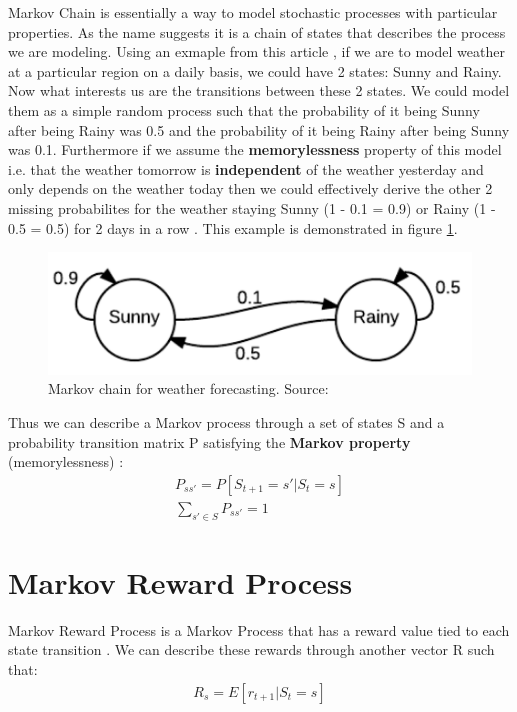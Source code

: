 Markov Chain is essentially a way to model stochastic
processes with
particular properties. As the name suggests it is a chain of
states that describes the process we are modeling. Using an
exmaple from this article \cite{markov_chain_article}, if we
are to model weather at a particular region on a daily basis,
we could have 2 states: Sunny and Rainy. Now what interests us
are the transitions between these 2 states. We could model
them as a simple random process such that the probability of
it being Sunny after being Rainy was 0.5 and the probability
of it being Rainy after being Sunny was 0.1. Furthermore if we
assume the \textbf{memorylessness} property of this model i.e.
that the weather tomorrow is \textbf{independent} of the
weather yesterday and only depends on the weather today then
we could effectively derive the other 2 missing probabilites
for the weather staying Sunny (1 - 0.1 = 0.9) or Rainy (1 -
0.5 = 0.5) for 2 days in a row \cite{markov_chain_article}. This example is demonstrated in figure \ref{fig:weather}.

\begin{figure}[H]
  \centering
  \includegraphics[scale=0.7]{figures/markov_weather.PNG}
  \caption{Markov chain for weather forecasting. Source: \cite{markov_chain_article}}
  \label{fig:weather}
\end{figure}

Thus we can describe a Markov process through a set of states S and a probability transition matrix P satisfying the \textbf{Markov property} (memorylessness) \cite{markov_chain_article}:
\begin{align}
    P_{ss'} = P[S_{t+1} = s' | S_{t} = s]\\
    \sum_{s' \in S} P_{ss'} = 1
\end{align}

\section{Markov Reward Process}
Markov Reward Process is a Markov Process that 
has a reward value tied to each state transition \cite{lecture_lets_go_markov}. We can describe these rewards through another vector R such that:
\begin{align}
    R_{s} = E[r_{t+1} | S_{t} = s] \label{eq:return_matrix}
\end{align}

